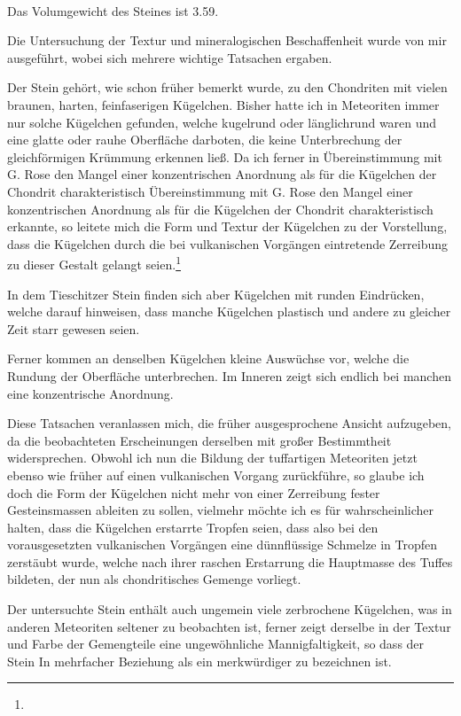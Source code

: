 \documentclass[a4paper, 11pt, oneside]{article}
\begin{document}
\paragraph{}
Das Volumgewicht des Steines ist 3.59.

Die Untersuchung der Textur und mineralogischen Beschaffenheit wurde von mir ausgeführt, wobei sich mehrere wichtige Tatsachen ergaben.

Der Stein gehört, wie schon früher bemerkt wurde, zu den Chondriten mit vielen braunen, harten, feinfaserigen Kügelchen. Bisher hatte ich in Meteoriten immer nur solche Kügelchen gefunden, welche kugelrund oder länglichrund waren und eine glatte oder rauhe Oberfläche darboten, die keine Unterbrechung der gleichförmigen Krümmung erkennen ließ. Da ich ferner in Übereinstimmung mit G. Rose den Mangel einer konzentrischen Anordnung als für die Kügelchen der Chondrit charakteristisch Übereinstimmung mit G. Rose den Mangel einer konzentrischen Anordnung als für die Kügelchen der Chondrit charakteristisch erkannte, so leitete mich die Form und Textur der Kügelchen zu der Vorstellung, dass die Kügelchen durch die bei vulkanischen Vorgängen eintretende Zerreibung zu dieser Gestalt gelangt seien.\footnote{}

In dem Tieschitzer Stein finden sich aber Kügelchen mit runden Eindrücken, welche darauf hinweisen, dass manche Kügelchen plastisch und andere zu gleicher Zeit starr gewesen seien.

Ferner kommen an denselben Kügelchen kleine Auswüchse vor, welche die Rundung der Oberfläche unterbrechen. Im Inneren zeigt sich endlich bei manchen eine konzentrische Anordnung.

Diese Tatsachen veranlassen mich, die früher ausgesprochene Ansicht aufzugeben, da die beobachteten Erscheinungen derselben mit großer Bestimmtheit widersprechen. Obwohl ich nun die Bildung der tuffartigen Meteoriten jetzt ebenso wie früher auf einen vulkanischen Vorgang zurückführe, so glaube ich doch die Form der Kügelchen nicht mehr von einer Zerreibung fester Gesteinsmassen ableiten zu sollen, vielmehr möchte ich es für wahrscheinlicher halten, dass die Kügelchen erstarrte Tropfen seien, dass also bei den vorausgesetzten vulkanischen Vorgängen eine dünnflüssige Schmelze in Tropfen zerstäubt wurde, welche nach ihrer raschen Erstarrung die Hauptmasse des Tuffes bildeten, der nun als chondritisches Gemenge vorliegt.

Der untersuchte Stein enthält auch ungemein viele zerbrochene Kügelchen, was in anderen Meteoriten seltener zu beobachten ist, ferner zeigt derselbe in der Textur und Farbe der Gemengteile eine ungewöhnliche Mannigfaltigkeit, so dass der Stein In mehrfacher Beziehung als ein merkwürdiger zu bezeichnen ist.
\end{document}
